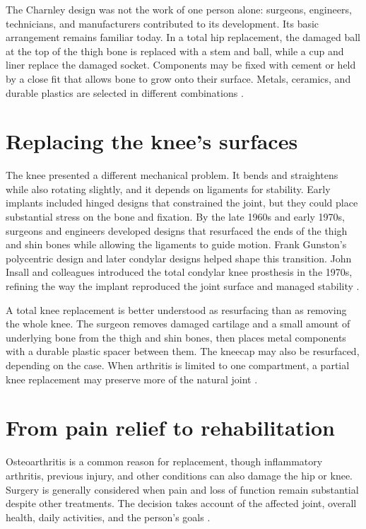 \documentclass[12pt,oneside]{book}
\begin{document}
The Charnley design was not the work of one person alone: surgeons,
engineers, technicians, and manufacturers contributed to its development.
Its basic arrangement remains familiar today. In a total hip replacement,
the damaged ball at the top of the thigh bone is replaced with a stem and
ball, while a cup and liner replace the damaged socket. Components may be
fixed with cement or held by a close fit that allows bone to grow onto
their surface. Metals, ceramics, and durable plastics are selected in
different combinations \cite{hipArthroplastyHistory,aaosHipReplacement}.

\section{Replacing the knee's surfaces}
The knee presented a different mechanical problem. It bends and straightens
while also rotating slightly, and it depends on ligaments for stability.
Early implants included hinged designs that constrained the joint, but
they could place substantial stress on the bone and fixation. By the late
1960s and early 1970s, surgeons and engineers developed designs that
resurfaced the ends of the thigh and shin bones while allowing the
ligaments to guide motion. Frank Gunston's polycentric design and later
condylar designs helped shape this transition. John Insall and colleagues
introduced the total condylar knee prosthesis in the 1970s, refining the
way the implant reproduced the joint surface and managed stability
\cite{kneeReplacementHistory}.

A total knee replacement is better understood as resurfacing than as
removing the whole knee. The surgeon removes damaged cartilage and a small
amount of underlying bone from the thigh and shin bones, then places metal
components with a durable plastic spacer between them. The kneecap may also
be resurfaced, depending on the case. When arthritis is limited to one
compartment, a partial knee replacement may preserve more of the natural
joint \cite{aaosKneeReplacement}.

\section{From pain relief to rehabilitation}
Osteoarthritis is a common reason for replacement, though inflammatory
arthritis, previous injury, and other conditions can also damage the hip
or knee. Surgery is generally considered when pain and loss of function
remain substantial despite other treatments. The decision takes account of
the affected joint, overall health, daily activities, and the person's
goals \cite{aaosHipReplacement,aaosKneeReplacement}.
\end{document}
